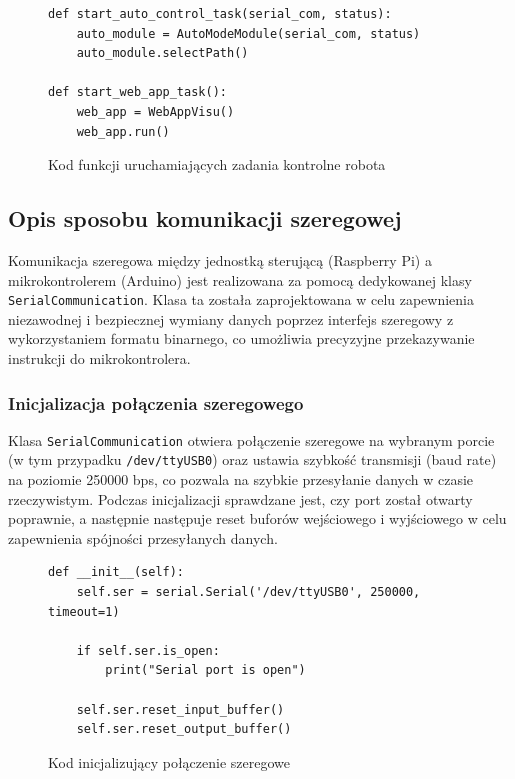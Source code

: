\begin{figure}[h!]
  \centering
  \begin{lstlisting}
def start_auto_control_task(serial_com, status):
    auto_module = AutoModeModule(serial_com, status)
    auto_module.selectPath()

def start_web_app_task():
    web_app = WebAppVisu()
    web_app.run()
  \end{lstlisting}
  \caption{Kod funkcji uruchamiających zadania kontrolne robota}
  \label{fig:tasks_start}
\end{figure}

\subsection{Opis sposobu komunikacji szeregowej}

Komunikacja szeregowa między jednostką sterującą (Raspberry Pi) a mikrokontrolerem (Arduino) jest realizowana za pomocą dedykowanej klasy \texttt{SerialCommunication}. Klasa ta została zaprojektowana w celu zapewnienia niezawodnej i bezpiecznej wymiany danych poprzez interfejs szeregowy z wykorzystaniem formatu binarnego, co umożliwia precyzyjne przekazywanie instrukcji do mikrokontrolera.

\subsubsection{Inicjalizacja połączenia szeregowego}

Klasa \texttt{SerialCommunication} otwiera połączenie szeregowe na wybranym porcie (w tym przypadku \texttt{/dev/ttyUSB0}) oraz ustawia szybkość transmisji (baud rate) na poziomie 250000 bps, co pozwala na szybkie przesyłanie danych w czasie rzeczywistym. Podczas inicjalizacji sprawdzane jest, czy port został otwarty poprawnie, a następnie następuje reset buforów wejściowego i wyjściowego w celu zapewnienia spójności przesyłanych danych.

\begin{figure}[h!]
  \centering
  \begin{lstlisting}
def __init__(self):
    self.ser = serial.Serial('/dev/ttyUSB0', 250000, timeout=1)

    if self.ser.is_open:
        print("Serial port is open")

    self.ser.reset_input_buffer()
    self.ser.reset_output_buffer()
  \end{lstlisting}
  \caption{Kod inicjalizujący połączenie szeregowe}
  \label{fig:serial_init}
\end{figure}

